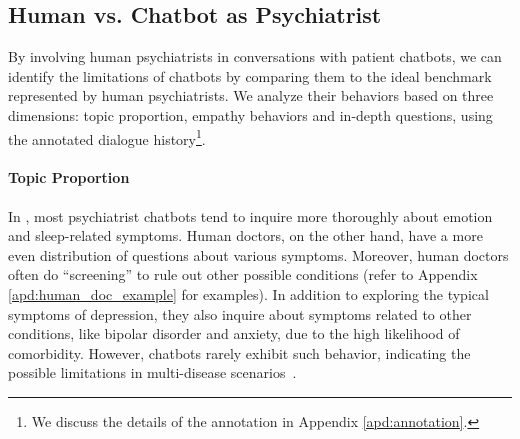 \subsection{Human vs. Chatbot as Psychiatrist}
\label{sec:comp_doctor}

By involving human psychiatrists in conversations with patient chatbots, we can identify the limitations of chatbots by comparing them to the ideal benchmark represented by human psychiatrists. We analyze their behaviors based on three dimensions: topic proportion, empathy behaviors and in-depth questions, using the annotated dialogue history\footnote{We discuss the details of the annotation in Appendix \ref{apd:annotation}.}.

\paragraph{Topic Proportion}
In , most psychiatrist chatbots tend to inquire more thoroughly about emotion and sleep-related symptoms. Human doctors, on the other hand, have a more even distribution of questions about various symptoms.
Moreover, human doctors often do ``screening'' to rule out other possible conditions (refer to Appendix \ref{apd:human_doc_example} for examples). In addition to exploring the typical symptoms of depression, they also inquire about symptoms related to other conditions, like bipolar disorder and anxiety, due to the high likelihood of comorbidity. However, chatbots rarely exhibit such behavior, indicating the possible limitations in multi-disease scenarios~\cite{Zhang2022SymptomIF}.

